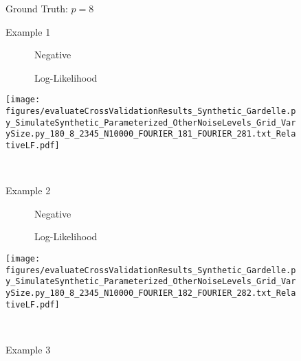  \begin{figure}
\center

Ground Truth: $p = 8$

Example 1

\begin{minipage}[c]{0.8\linewidth}

\end{minipage}
\begin{minipage}[c]{0.19\linewidth}
\centering

\ \ \ \ \ \ Negative

\ \ \ \ \ \ Log-Likelihood

\texttt{[image: figures/evaluateCrossValidationResults\_Synthetic\_Gardelle.py\_SimulateSynthetic\_Parameterized\_OtherNoiseLevels\_Grid\_VarySize.py\_180\_8\_2345\_N10000\_FOURIER\_181\_FOURIER\_281.txt\_RelativeLF.pdf]}
\end{minipage}

\ 

Example 2

\begin{minipage}[c]{0.8\linewidth}

\end{minipage}
\begin{minipage}[c]{0.19\linewidth}
\centering

\ \ \ \ \ \ Negative

\ \ \ \ \ \ Log-Likelihood

\texttt{[image: figures/evaluateCrossValidationResults\_Synthetic\_Gardelle.py\_SimulateSynthetic\_Parameterized\_OtherNoiseLevels\_Grid\_VarySize.py\_180\_8\_2345\_N10000\_FOURIER\_182\_FOURIER\_282.txt\_RelativeLF.pdf]}
\end{minipage}

\ 

Example 3

\begin{minipage}[c]{0.8\linewidth}


\end{minipage}
\end{figure}

